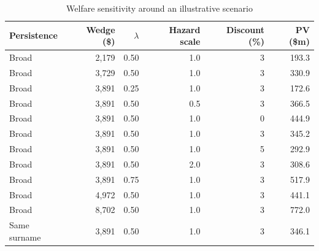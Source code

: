 \begin{table}[!ht]\centering
\caption{Welfare sensitivity around an illustrative scenario}\label{tab:welfare_sensitivity}
{\small
\begin{tabular}{lrrrrr}\toprule
Persistence & Wedge (\$) & $\lambda$ & Hazard scale & Discount (\%) & PV (\$m) \\
\midrule
Broad & 2,179 & 0.50 & 1.0 & 3 & 193.3 \\
Broad & 3,729 & 0.50 & 1.0 & 3 & 330.9 \\
Broad & 3,891 & 0.25 & 1.0 & 3 & 172.6 \\
Broad & 3,891 & 0.50 & 0.5 & 3 & 366.5 \\
Broad & 3,891 & 0.50 & 1.0 & 0 & 444.9 \\
Broad & 3,891 & 0.50 & 1.0 & 3 & 345.2 \\
Broad & 3,891 & 0.50 & 1.0 & 5 & 292.9 \\
Broad & 3,891 & 0.50 & 2.0 & 3 & 308.6 \\
Broad & 3,891 & 0.75 & 1.0 & 3 & 517.9 \\
Broad & 4,972 & 0.50 & 1.0 & 3 & 441.1 \\
Broad & 8,702 & 0.50 & 1.0 & 3 & 772.0 \\
Same surname & 3,891 & 0.50 & 1.0 & 3 & 346.1 \\
\bottomrule\end{tabular}}
\begin{minipage}{0.96\textwidth}\end{minipage}\end{table}
